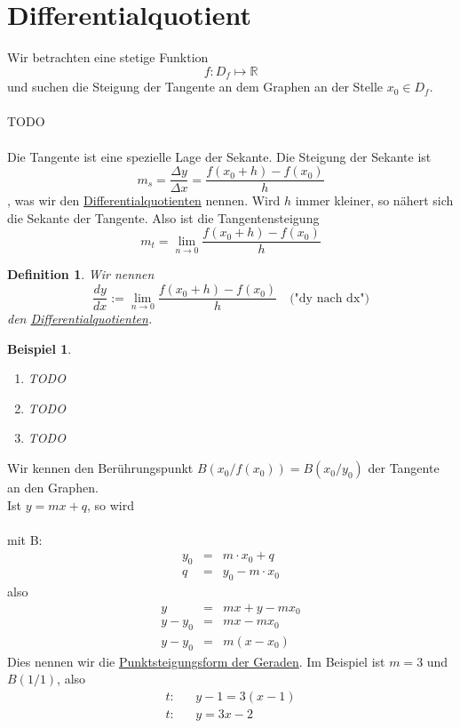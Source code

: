 \documentclass{report}
\newtheorem{mydef}{Definition}
\newtheorem{myexample}{Beispiel}
\begin{document}
\section{Differentialquotient}
Wir betrachten eine stetige Funktion
\begin{equation}f: D_f \mapsto \mathbb{R}\end{equation}
und suchen die Steigung der Tangente an dem Graphen an der Stelle $x_0 \in D_f$.
\\\\TODO\\\\
Die Tangente ist eine spezielle Lage der Sekante. Die Steigung der Sekante ist
\begin{equation}m_s = \frac{\Delta y}{\Delta x} = \frac{f(x_0 + h) - f(x_0)}{h}\end{equation}
, was wir den \underline{Differentialquotienten} nennen. Wird $h$ immer kleiner, so nähert sich die Sekante der Tangente. Also ist die Tangentensteigung
\begin{equation}m_t = \lim_{n \to 0} \frac{f(x_0 + h) - f(x_0)}{h}\end{equation}
\begin{mydef}Wir nennen
\begin{equation}\frac{dy}{dx} := \lim_{n \to 0} \frac{f(x_0 + h) - f(x_0)}{h} \quad \mbox{("dy nach dx")}\end{equation}
den \underline{Differentialquotienten}.\end{mydef}
\begin{myexample}\begin{enumerate}
\item TODO
\item TODO
\item TODO
\end{enumerate}\end{myexample}
Wir kennen den Berührungspunkt $B(x_0 / f(x_0)) = B (x_0 / y_0)$ der Tangente an den Graphen.\\
Ist $y = mx + q$, so wird\\\\
mit B: \begin{eqnarray}y_0 & = & m \cdot x_0 + q \nonumber \\
q & = & y_0 - m \cdot x_0\end{eqnarray}
also
\begin{eqnarray}y & = & mx + y - mx_0 \nonumber \\
y - y_0 & = & mx - mx_0 \nonumber \\
y - y_0 & = & m(x - x_0) \end{eqnarray}
Dies nennen wir die \underline{Punktsteigungsform der Geraden}. Im Beispiel ist $m = 3$ und $B(1/1)$, also
\begin{eqnarray}t:& & y - 1 = 3(x-1) \nonumber \\
t: & & y = 3x -2\end{eqnarray}
\end{document}
